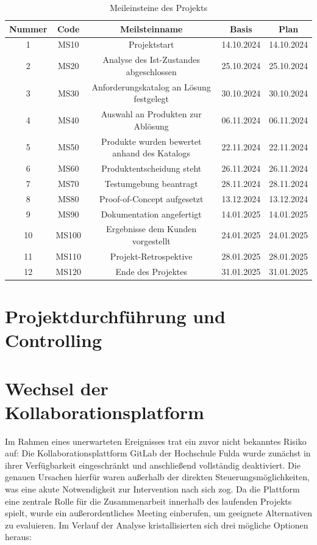 \documentclass[12pt,oneside]{article}
\begin{document}
\begin{table}[h]
  \centering
\begin{tabular}{|c|c|c|c|c|}
  \hline
  Nummer & Code & Meilsteinname & Basis & Plan \\
  \hline
  1 & MS10 & Projektstart & 14.10.2024 & 14.10.2024 \\
  \hline
  2 & MS20 & Analyse des Ist-Zustandes abgeschlossen & 25.10.2024 & 25.10.2024 \\
  \hline
  3 & MS30 & Anforderungskatalog an Lösung festgelegt & 30.10.2024 & 30.10.2024 \\
  \hline
  4 & MS40 & Auswahl an Produkten zur Ablösung & 06.11.2024 & 06.11.2024 \\
  \hline
  5 & MS50 & Produkte wurden bewertet anhand des Katalogs & 22.11.2024 & 22.11.2024 \\
  \hline
  6 & MS60 & Produktentscheidung steht & 26.11.2024 & 26.11.2024 \\
  \hline
  7 & MS70 & Testumgebung beantragt & 28.11.2024 & 28.11.2024 \\
  \hline
  8 & MS80 & Proof-of-Concept aufgesetzt & 13.12.2024 & 13.12.2024 \\
  \hline
  9 & MS90 & Dokumentation angefertigt & 14.01.2025 & 14.01.2025 \\
  \hline
  10 & MS100 & Ergebnisse dem Kunden vorgestellt & 24.01.2025 & 24.01.2025 \\
  \hline
  11 & MS110 & Projekt-Retrospektive & 28.01.2025 & 28.01.2025 \\
  \hline
  12 & MS120 & Ende des Projektes & 31.01.2025 & 31.01.2025 \\
  \hline
\end{tabular}

\caption{Meileinsteine des Projekts}
\label{tab:milestones}

\end{table}

\section{Projektdurchführung und Controlling}

\section{Wechsel der Kollaborationsplatform}
Im Rahmen eines unerwarteten Ereignisses trat ein zuvor nicht bekanntes Risiko auf: Die Kollaborationsplattform GitLab der Hochschule Fulda wurde zunächst in ihrer Verfügbarkeit eingeschränkt und anschließend vollständig deaktiviert. Die genauen Ursachen hierfür waren außerhalb der direkten Steuerungsmöglichkeiten, was eine akute Notwendigkeit zur Intervention nach sich zog. 
Da die Plattform eine zentrale Rolle für die Zusammenarbeit innerhalb des laufenden Projekts spielt, wurde ein außerordentliches Meeting einberufen, um geeignete Alternativen zu evaluieren. Im Verlauf der Analyse kristallisierten sich drei mögliche Optionen heraus:
\end{document}
